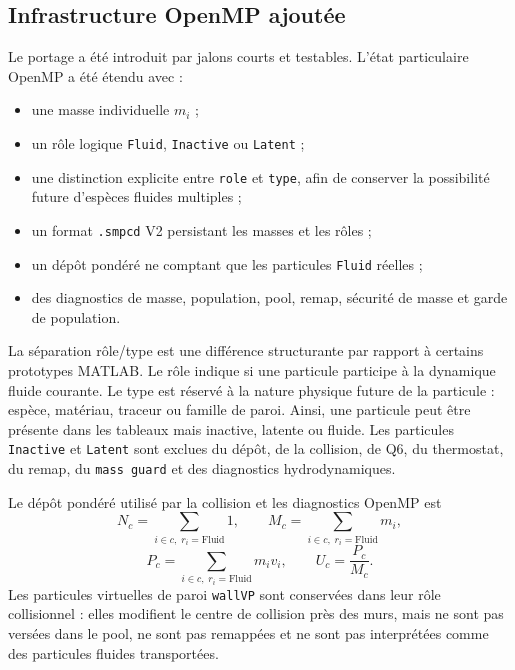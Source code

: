 \documentclass[11pt,a4paper]{article}
\begin{document}
\subsection{Infrastructure OpenMP ajoutée}

Le portage a été introduit par jalons courts et testables. L'état particulaire OpenMP a été étendu avec :
\begin{itemize}
  \item une masse individuelle $m_i$ ;
  \item un rôle logique \texttt{Fluid}, \texttt{Inactive} ou \texttt{Latent} ;
  \item une distinction explicite entre \texttt{role} et \texttt{type}, afin de conserver la possibilité future d'espèces fluides multiples ;
  \item un format \texttt{.smpcd} V2 persistant les masses et les rôles ;
  \item un dépôt pondéré ne comptant que les particules \texttt{Fluid} réelles ;
  \item des diagnostics de masse, population, pool, remap, sécurité de masse et garde de population.
\end{itemize}

La séparation rôle/type est une différence structurante par rapport à certains prototypes MATLAB. Le rôle indique si une particule participe à la dynamique fluide courante. Le type est réservé à la nature physique future de la particule : espèce, matériau, traceur ou famille de paroi. Ainsi, une particule peut être présente dans les tableaux mais inactive, latente ou fluide. Les particules \texttt{Inactive} et \texttt{Latent} sont exclues du dépôt, de la collision, de Q6, du thermostat, du remap, du \texttt{mass guard} et des diagnostics hydrodynamiques.

Le dépôt pondéré utilisé par la collision et les diagnostics OpenMP est
\begin{equation}
  N_c = \sum_{i\in c,\;r_i=\mathrm{Fluid}} 1,\qquad
  M_c = \sum_{i\in c,\;r_i=\mathrm{Fluid}} m_i,
\end{equation}
\begin{equation}
  P_c = \sum_{i\in c,\;r_i=\mathrm{Fluid}} m_i v_i,
  \qquad
  U_c = \frac{P_c}{M_c}.
\end{equation}
Les particules virtuelles de paroi \texttt{wallVP} sont conservées dans leur rôle collisionnel : elles modifient le centre de collision près des murs, mais ne sont pas versées dans le pool, ne sont pas remappées et ne sont pas interprétées comme des particules fluides transportées.
\end{document}

